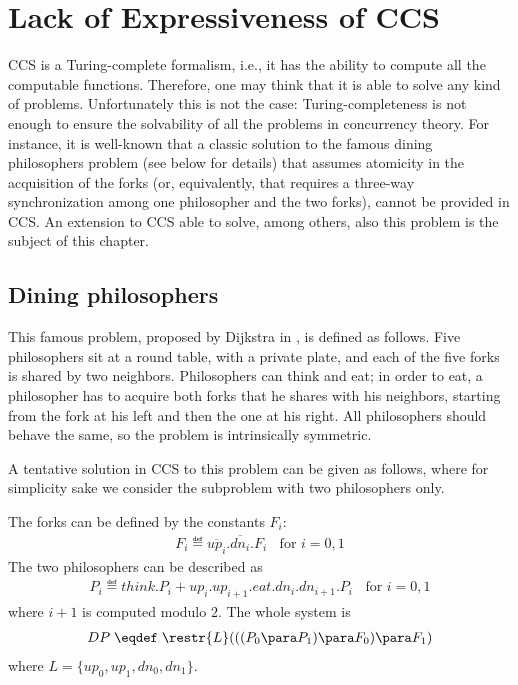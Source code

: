 




\section{Lack of Expressiveness of CCS}

CCS is a Turing-complete formalism, i.e., it has the ability to compute all the computable functions. Therefore, one may think that it is able to solve any kind of problems. Unfortunately this is not the case: Turing-completeness is not enough to ensure the solvability of all the problems in concurrency theory. For instance, it is well-known that a classic solution to the famous dining philosophers problem \cite{Dij71} (see below for details) that assumes atomicity in the acquisition of the forks (or, equivalently, that requires a three-way synchronization among one philosopher and the two forks), cannot be provided in CCS. An extension to CCS able to solve, among others, also this problem is the subject of this chapter.

\subsection{Dining philosophers}
This famous problem, proposed by Dijkstra in \cite{Dij71}, is defined as follows. Five philosophers sit at a round table, with a private plate, and each of the five forks is shared by two neighbors. Philosophers can think and eat; in order to eat, a philosopher has to acquire both forks that he shares with his neighbors, starting from the fork at his left and then the one at his right. All philosophers should behave the same, so the problem is intrinsically symmetric.

A tentative solution in CCS to this problem can be given as follows, where for simplicity sake we consider the subproblem with two philosophers only.

The forks can be defined by the constants $F_i$: 
\begin{eqnarray*}
F_i \eqdef  \overline{up_i}.\overline{dn_i}.F_i \; \;  \mbox{   for  }i = 0, 1  
\end{eqnarray*}
The two philosophers can be described as 
\begin{eqnarray*}
P_i \eqdef think.P_i +  up_i.up_{i+1}.eat.dn_i.dn_{i+1}.P_i  \; \;  \mbox{   for  }i = 0, 1 
\end{eqnarray*}
where $i+1$ is computed modulo $2$. 
The whole system is 
\begin{eqnarray*}
DP \;  \eqdef \;  \restr{L}(((P_0\para P_1) \para F_0) \para F_1) 
\end{eqnarray*}
where $L = \{up_0, up_1, dn_0, dn_1\}$. 

